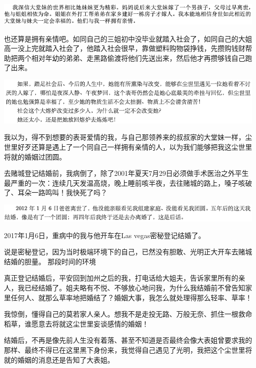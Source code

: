 \documentclass[9pt, b5paper]{article}
\begin{document}
\begin{center}
\includegraphics[width=.9\linewidth]{./pic/backups_plans_20210423_211802.png}
\end{center}

也还算是拥有亲情吧。如同自己的三姐初中没毕业就踏入社会了，如同自己的大姐高一没上完就踏入社会了，他踏入社会很早，靠做塑料购物袋挣钱，先攒购钱财帮助把两个相对年幼的弟弟、走黑路偷渡将他们先送出来，然后他才再攒够钱自己跑了出来。

\begin{center}
\includegraphics[width=.9\linewidth]{./pic/backups_plans_20210423_213157.png}
\end{center}

我以为，得不到想要的表哥爱情的我，与自己那领养来的叔叔家的大堂妹一样，尘世里好歹还算是遇上了一个同自己一样拥有亲情的人，以为我们能够把我这尘世里将就的婚姻过团圆。

去赌城登记结婚前，我病倒了，除了2001年夏天7月29日必须做手术医治之外平生最严重的一次：连续几天发温高烧，晚上睡前咳半夜，去往赌城的路上，嗓子咳破了、耳朵一路鸣叫！我快死了吗？

\begin{center}
\includegraphics[width=.9\linewidth]{./pic/backups_plans_20210423_213744.png}
\end{center}

2017年1月6日，重病中的我与他开车在Las vegas密秘登记结婚了。

说是密秘登记，因为当时极端环境下的自己，已然没有胆敢、光明正大开车去赌城结婚的胆量。
那段时间的环境

真正登记结婚后，平安回到加州之后的我，打电话给大姐夫，告诉家里所有的亲人，我已经结婚了。姐夫略有不悦、不够放心地问我，为什么我结婚前不曾告知家里任何人、就那么草率地把婚结了？婚姻大事，我怎么就处理得那么轻率、草率！

我惊倒，懂得自己的莫若家人亲人。想我不是走投无路、万般无奈、抓住一根救命稻草，谁愿意去将就这尘世里妄谈感情的婚姻！

结婚后，不再是像先前人生没有着落、甚至不知道是否最终会像大表姐曾要求我的那样、最终不得已在这里黑下身份来，我觉得自己遇见了光明，我把这个尘世里将就的婚姻的消息还是告知了大表姐。
\end{document}
